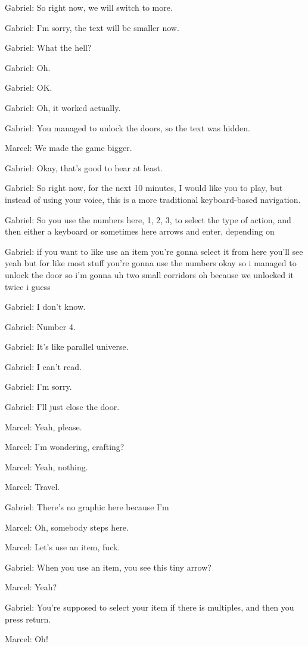 Gabriel: So right now, we will switch to more.

Gabriel: I'm sorry, the text will be smaller now.

Gabriel: What the hell?

Gabriel: Oh.

Gabriel: OK.

Gabriel: Oh, it worked actually.

Gabriel: You managed to unlock the doors, so the text was hidden.

Marcel: We made the game bigger.

Gabriel: Okay, that's good to hear at least.

Gabriel: So right now, for the next 10 minutes, I would like you to play, but instead of using your voice, this is a more traditional keyboard-based navigation.

Gabriel: So you use the numbers here, 1, 2, 3, to select the type of action, and then either a keyboard or sometimes here arrows and enter, depending on

Gabriel: if you want to like use an item you're gonna select it from here you'll see yeah but for like most stuff you're gonna use the numbers okay so i managed to unlock the door so i'm gonna uh two small corridors oh because we unlocked it twice i guess

Gabriel: I don't know.

Gabriel: Number 4.

Gabriel: It's like parallel universe.

Gabriel: I can't read.

Gabriel: I'm sorry.

Gabriel: I'll just close the door.

Marcel: Yeah, please.

Marcel: I'm wondering, crafting?

Marcel: Yeah, nothing.

Marcel: Travel.

Gabriel: There's no graphic here because I'm

Marcel: Oh, somebody steps here.

Marcel: Let's use an item, fuck.

Gabriel: When you use an item, you see this tiny arrow?

Marcel: Yeah?

Gabriel: You're supposed to select your item if there is multiples, and then you press return.

Marcel: Oh!

